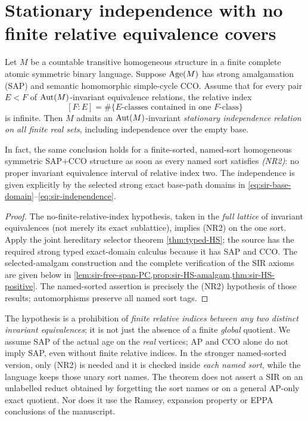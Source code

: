 \section{Stationary independence with no finite relative equivalence covers}
\label{sec:sir-selector}

\begin{theorem}
\label{thm:sir-no-finite-cover}
Let \(M\) be a countable transitive homogeneous structure in a
finite complete atomic symmetric binary language. Suppose
\(\operatorname{Age}(M)\) has strong amalgamation (SAP) and semantic
homomorphic simple-cycle CCO. Assume that for every pair
\(E<F\) of \(\operatorname{Aut}(M)\)-invariant equivalence relations,
the relative index
\[
       [F:E]=\#\{E\text{-classes contained in one }F\text{-class}\}
\]
is infinite. Then \(M\) admits an \(\operatorname{Aut}(M)\)-invariant
\emph{stationary independence relation on all finite real sets},
including independence over the empty base.

In fact, the same conclusion holds for a finite-sorted,
named-sort homogeneous symmetric SAP+CCO structure as soon as
every named sort satisfies \emph{(NR2)}: no proper invariant
equivalence interval of relative index two. The independence
is given explicitly by the selected strong exact base-path
domains in \eqref{eq:sir-base-domain}--\eqref{eq:sir-independence}.
\end{theorem}
\begin{proof}
The no-finite-relative-index hypothesis, taken in the
\emph{full lattice} of invariant equivalences (not merely
its exact sublattice), implies (NR2) on the one sort.
Apply the joint hereditary selector theorem
\cref{thm:typed-HS}; the source has the required strong
typed exact-domain calculus because it has SAP and CCO.
The selected-amalgam construction and the complete
verification of the SIR axioms are given below in
\cref{lem:sir-free-span-PC,prop:sir-HS-amalgam,thm:sir-HS-positive}.
The named-sorted assertion is precisely the (NR2)
hypothesis of those results; automorphisms preserve
all named sort tags.
\end{proof}

\begin{remark}
\label{rem:sir-positive-boundary}
The hypothesis is a prohibition of \emph{finite relative
indices between any two distinct invariant equivalences};
it is not just the absence of a finite \emph{global}
quotient. We assume SAP of the actual age on the
\emph{real} vertices; AP and CCO alone do not imply SAP,
even without finite relative indices. In the stronger
named-sorted version, only (NR2) is needed and it
is checked inside \emph{each named sort}, while the
language keeps those unary sort names. The theorem
does not assert a SIR on an unlabelled reduct obtained
by forgetting the sort names or on a general AP-only
exact quotient. Nor does it use the Ramsey, expansion
property or EPPA conclusions of the manuscript.
\end{remark}

